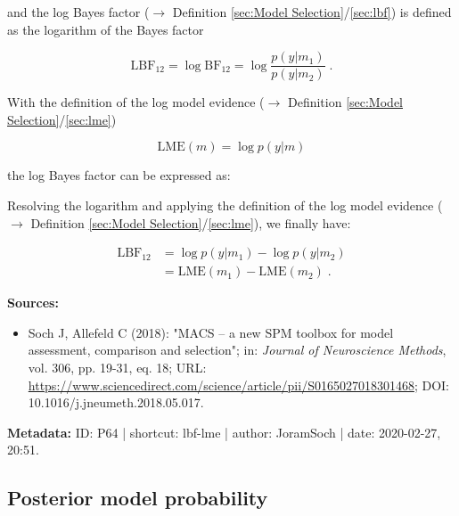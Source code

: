 \documentclass[a4paper,12pt,twoside]{book}
\begin{document}
and the log Bayes factor ($\rightarrow$ Definition \ref{sec:Model Selection}/\ref{sec:lbf}) is defined as the logarithm of the Bayes factor

\begin{equation} \label{eq:lbf-lme-LBF}
\mathrm{LBF}_{12} = \log \mathrm{BF}_{12} = \log \frac{p(y|m_1)}{p(y|m_2)} \; .
\end{equation}

With the definition of the log model evidence ($\rightarrow$ Definition \ref{sec:Model Selection}/\ref{sec:lme})

\begin{equation} \label{eq:lbf-lme-LME}
\mathrm{LME}(m) = \log p(y|m)
\end{equation}

the log Bayes factor can be expressed as:

Resolving the logarithm and applying the definition of the log model evidence ($\rightarrow$ Definition \ref{sec:Model Selection}/\ref{sec:lme}), we finally have:

\begin{equation} \label{eq:lbf-lme-LBF-LME-qed}
\begin{split}
\mathrm{LBF}_{12} &= \log p(y|m_1) - \log p(y|m_2) \\
&= \mathrm{LME}(m_1) - \mathrm{LME}(m_2) \; .
\end{split}
\end{equation}


\vspace{1em}
\textbf{Sources:}
\begin{itemize}
\item Soch J, Allefeld C (2018): "MACS – a new SPM toolbox for model assessment, comparison and selection"; in: \textit{Journal of Neuroscience Methods}, vol. 306, pp. 19-31, eq. 18; URL: \url{https://www.sciencedirect.com/science/article/pii/S0165027018301468}; DOI: 10.1016/j.jneumeth.2018.05.017.
\end{itemize}


\vspace{1em}
\textbf{Metadata:} ID: P64 | shortcut: lbf-lme | author: JoramSoch | date: 2020-02-27, 20:51.
\vspace{1em}



\subsection{Posterior model probability}
\end{document}
